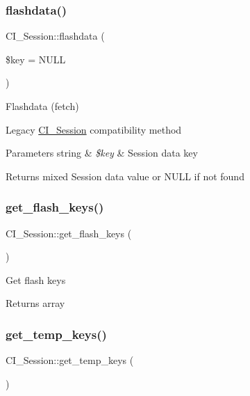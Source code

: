 \subsubsection{\texorpdfstring{flashdata()}{flashdata()}}
{\footnotesize\ttfamily C\+I\+\_\+\+Session\+::flashdata (\begin{DoxyParamCaption}\item[{}]{\$key = {\ttfamily NULL} }\end{DoxyParamCaption})}

Flashdata (fetch)

Legacy \mbox{\hyperlink{class_c_i___session}{C\+I\+\_\+\+Session}} compatibility method


\begin{DoxyParams}[1]{Parameters}
string & {\em \$key} & Session data key \\
\hline
\end{DoxyParams}
\begin{DoxyReturn}{Returns}
mixed Session data value or N\+U\+LL if not found 
\end{DoxyReturn}
\mbox{\label{class_c_i___session_a587196896821149b9b55cc73b2406c55}} 
\subsubsection{\texorpdfstring{get\+\_\+flash\+\_\+keys()}{get\_flash\_keys()}}
{\footnotesize\ttfamily C\+I\+\_\+\+Session\+::get\+\_\+flash\+\_\+keys (\begin{DoxyParamCaption}{ }\end{DoxyParamCaption})}

Get flash keys

\begin{DoxyReturn}{Returns}
array 
\end{DoxyReturn}
\mbox{\label{class_c_i___session_a0999ab99fdf51f50e3b220d2bc80ca57}} 
\subsubsection{\texorpdfstring{get\+\_\+temp\+\_\+keys()}{get\_temp\_keys()}}
{\footnotesize\ttfamily C\+I\+\_\+\+Session\+::get\+\_\+temp\+\_\+keys (\begin{DoxyParamCaption}{ }\end{DoxyParamCaption})}

